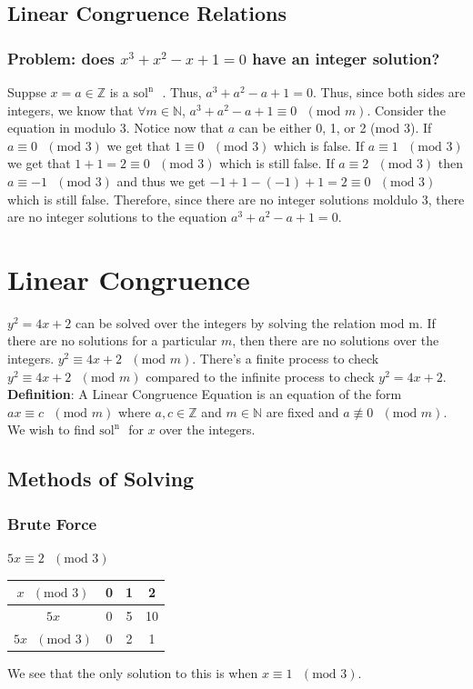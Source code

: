 \documentclass[oneside]{book}
\newcommand\tab[1][1cm]{\hspace*{#1}}
\newcommand\nextline{\newline\tab}
\newcommand\soln{$\text{sol}^\text{n}\text{ }$}
\newcommand\defn{\textbf{Definition}: }
\renewcommand\mod[1]{\text{ }\left(\text{mod }#1\right)}
\begin{document}
\section{Linear Congruence Relations}
\subsection{Problem: does $x^3+x^2-x+1=0$ have an integer solution?}
\tab
Suppse $x=a\in\mathbb{Z}$ is a \soln. Thus, $a^3+a^2-a+1=0$. Thus, since both sides are integers, we know that $\forall m \in \mathbb{N}$, $a^3+a^2-a+1\equiv 0 \mod{m}$.
\nextline
Consider the equation in modulo 3. Notice now that $a$ can be either 0, 1, or 2 (mod 3). If $a\equiv0\mod{3}$ we get that $1\equiv0\mod{3}$ which is false. If $a\equiv1\mod{3}$ we get that $1+1=2\equiv0\mod{3}$ which is still false. If $a\equiv2\mod{3}$ then $a\equiv-1\mod{3}$ and thus we get $-1+1-(-1)+1=2\equiv0\mod{3}$ which is still false. Therefore, since there are no integer solutions moldulo 3, there are no integer solutions to the equation $a^3+a^2-a+1=0$.
\chapter{Linear Congruence}
\tab $y^2=4x+2$ can be solved over the integers by solving the relation mod m. If there are no solutions for a particular $m$, then there are no solutions over the integers. $y^2\equiv4x+2\mod{m}$. There's a finite process to check $y^2 \equiv 4x+2\mod{m}$ compared to the infinite process to check $y^2=4x+2$.
\nextline
\defn A Linear Congruence Equation is an equation of the form $ax\equiv c\mod{m}$ where $a,c\in\mathbb{Z}$ and $m\in\mathbb{N}$ are fixed and $a\not\equiv 0\mod{m}$. We wish to find \soln for $x$ over the integers.
\section{Methods of Solving}
\subsection{Brute Force}
$5x\equiv 2\mod{3}$ 
\begin{center}
\begin{tabular}{|c|c|c|c|}
$x\mod{3}$ & 0 & 1 & 2 \\
\hline
$5x$ & 0 & 5 & 10 \\
\hline
$5x\mod{3}$ & 0 & 2 & 1 \\
\end{tabular}
\end{center}
\tab
We see that the only solution to this is when $x\equiv 1\mod{3}$.
\end{document}
